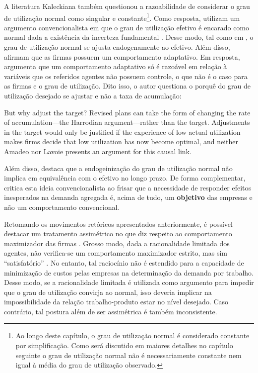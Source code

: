 A literatura Kaleckiana também questionou a razoabilidade de considerar o grau de utilização normal como singular e constante\footnote{Ao longo deste capítulo, o grau de utilização normal é considerado constante por simplificação. Como será discutido em maiores detalhes no capítulo 
	seguinte
	o grau de utilização normal não é necessariamente constante nem igual à média do grau de utilização observado.}. Como resposta, utilizam um argumento convencionalista em que o grau de utilização efetivo é encarado como normal dada a existência da incerteza fundamental \cite{lavoie_kaleckian_1995}. Desse modo, tal como em \textcite{amadeo_role_1986}, o grau de utilização normal se ajusta endogenamente ao efetivo. Além disso, afirmam que as firmas possuem um comportamento adaptativo. Em resposta, \textcite{skott_theoretical_2012} argumenta que um comportamento adaptativo só é razoável em relação à variáveis que os referidos agentes não possuem controle, o que não é o caso para as firmas e o grau de utilização. Dito isso, o autor questiona o porquê do grau de utilização desejado se ajustar e não a taxa de acumulação:

\begin{citacao}
But why adjust the target? Revised plans can take the form of changing the rate of accumulation—the Harrodian argument—rather than the target. Adjustments in the target would only be justified if the experience of low actual utilization makes firms decide that low utilization has now become optimal, and neither Amadeo nor Lavoie presents an argument for this causal link. \cite[p.120]{skott_theoretical_2012}
\end{citacao}
Além disso, destaca que a endogeinização do grau de utilização normal não implica em equivalência com o efetivo no longo prazo. De forma complementar, \textcite{nikiforos_utilization_2016} critica esta ideia convencionalista ao frisar que a necessidade de responder efeitos inesperados na demanda agregada é, acima de tudo, um \textbf{objetivo} das empresas e não um comportamento convencional. 

Retomando os movimentos retóricos apresentados anteriormente, é possível destacar um tratamento assimétrico no que diz respeito ao comportamento maximizador das firmas \cite[p.~123]{skott_theoretical_2012}. Grosso modo, dada a racionalidade limitada dos agentes, não verifica-se um comportamento maximizador estrito, mas sim ``satisfatório''  \cite{dutt_equilibrium_2010}. No entanto, tal raciocínio não é estendido para a capacidade de minimização de custos pelas empresas na determinação da demanda por trabalho. Desse modo, se a racionalidade limitada é utilizada como argumento para impedir que o grau de utilização convirja ao normal, isso deveria implicar na impossibilidade da relação trabalho-produto estar no nível desejado. Caso contrário, tal postura além de ser assimétrica é também inconsistente.


